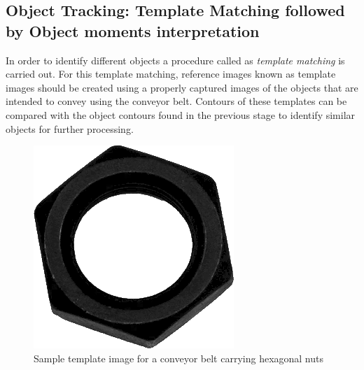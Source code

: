 \documentclass[a4paper,12pt]{book}%
\begin{document}
\subsection{Object Tracking: Template Matching followed by Object moments interpretation}

In order to identify different objects a procedure called as \textit{template matching} is carried out. For this template matching, reference images known as template images should be created using a properly captured images of the objects that are intended to convey using the conveyor belt. Contours of these templates can be compared with the object contours found in the previous stage to identify similar objects for further processing. 

\begin{figure}[H]
	\centering
	\includegraphics[scale=0.45]{figures/template}
	\caption{Sample template image for a conveyor belt carrying hexagonal nuts}
\end{figure}

%
%

\end{document}
